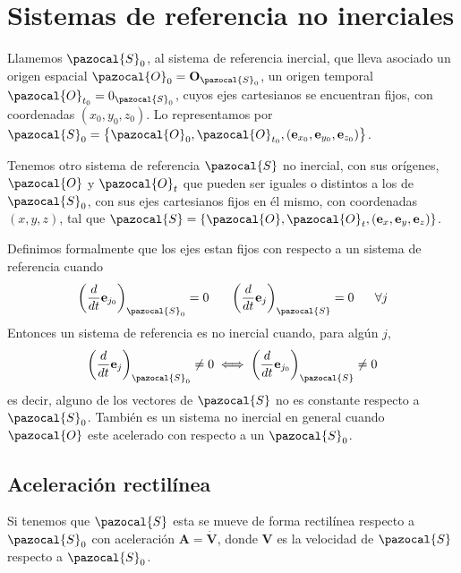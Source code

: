 \chapter{Sistemas de referencia no inerciales} 
Llamemos $\pazocal{S}_0$, al sistema de referencia inercial, que lleva asociado un origen espacial $\pazocal{O}_0 = \mathbf{O}_{\pazocal{S}_0}$, un origen temporal $\pazocal{O}_{t_0}=0_{\pazocal{S}_0}$, cuyos ejes cartesianos se encuentran fijos, con coordenadas $(x_0,y_0,z_0)$. Lo representamos por $\pazocal{S}_0 = \left\{\pazocal{O}_0,\pazocal{O}_{t_0},(\mathbf{e}_{x_0},\mathbf{e}_{y_0},\mathbf{e}_{z_0})\right\}$.

Tenemos otro sistema de referencia $\pazocal{S}$ no inercial, con sus orígenes, $\pazocal{O}$ y $\pazocal{O}_{t}$ que pueden ser iguales o distintos a los de $\pazocal{S}_0$, con sus ejes cartesianos fijos en él mismo, con coordenadas $(x,y,z)$, tal que $\pazocal{S} = \left\{\pazocal{O},\pazocal{O}_{t},(\mathbf{e}_x,\mathbf{e}_y,\mathbf{e}_z)\right\}$.

Definimos formalmente que los ejes estan fijos con respecto a un sistema de referencia cuando 
\begin{equation} \label{6.1.1}
    \left(\frac{d}{dt}\mathbf{e}_{j_0}\right)_{\pazocal{S}_0} = 0 \ \ \ \ \ \left(\frac{d}{dt}\mathbf{e}_j\right)_{\pazocal{S}} = 0 \ \ \ \ \ \forall j
\end{equation} 
Entonces un sistema de referencia es no inercial cuando, para algún $j$,
\begin{equation} \label{6.1.1}
    \left(\frac{d}{dt}\mathbf{e}_j\right)_{\pazocal{S}_0} \neq 0 \iff \left(\frac{d}{dt}\mathbf{e}_{j_0}\right)_{\pazocal{S}} \neq 0 
\end{equation} 
es decir, alguno de los vectores de $\pazocal{S}$ no es constante respecto a $\pazocal{S}_0$. También es un sistema no inercial en general cuando $\pazocal{O}$ este acelerado con respecto a un $\pazocal{S}_0$.
\section{Aceleración rectilínea}
Si tenemos que $\pazocal{S}$ esta se mueve de forma rectilínea respecto a $\pazocal{S}_0$ con aceleración $\mathbf{A}=\dot{\mathbf{V}}$, donde $\mathbf{V}$ es la velocidad de $\pazocal{S}$ respecto a $\pazocal{S}_0$.

